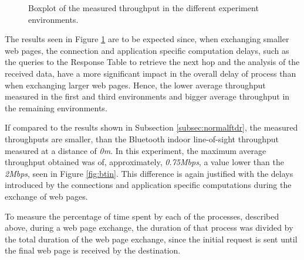 \begin{figure}[ht]
	\noindent{}
	\caption{\label{fig:boxplotthroughput} Boxplot of the measured throughput in the different experiment environments.}
\end{figure}

The results seen in Figure \ref{fig:boxplotthroughput} are to be expected since, when exchanging smaller web pages, the connection and application specific computation delays, such as the queries to the Response Table to retrieve the next hop and the analysis of the received data, have a more significant impact in the overall delay of process than when exchanging larger web pages. Hence, the lower average throughput measured in the first and third environments and bigger average throughput in the remaining environments.

If compared to the results shown in Subsection \ref{subsec:normalftdr}, the measured throughputs are smaller, than the Bluetooth indoor line-of-sight throughput measured at a distance of \textit{0m}. In this experiment, the maximum average throughput obtained was of, approximately, \textit{0.75Mbps}, a value lower than the \textit{2Mbps}, seen in Figure \ref{fig:btin}. This difference is again justified with the delays introduced by the connections and application specific computations during the exchange of web pages.

To measure the percentage of time spent by each of the processes, described above, during a web page exchange, the duration of that process was divided by the total duration of the web page exchange, since the initial request is sent until the final web page is received by the destination.

